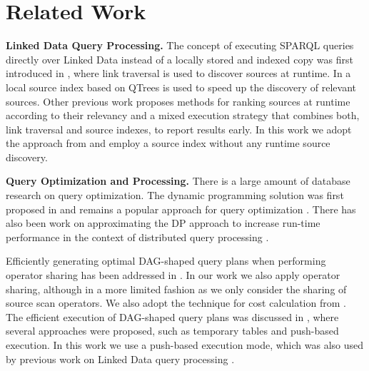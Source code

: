 \section{Related Work}
\label{sec:related}

\textbf{Linked Data Query Processing.} The concept of executing SPARQL
queries directly over Linked Data instead of a locally stored and
indexed copy was first introduced in \cite{hartig_executing_2009},
where link traversal is used to discover sources at runtime. In
\cite{harth_data_2010} a local source index based on QTrees is used to
speed up the discovery of relevant sources. Other previous work
\cite{ladwig_linked_2010,sihjoin_2011} proposes methods for ranking
sources at runtime according to their relevancy and a mixed execution
strategy that combines both, link traversal and source indexes, to
report results early. In this work we adopt the approach from
\cite{harth_data_2010} and employ a source index without any runtime
source discovery. %






\textbf{Query Optimization and Processing.} There is a large amount of
database research on query optimization. The dynamic programming
solution was first proposed in \cite{selinger_access_1979} and remains a
popular approach for query optimization
\cite{moerkotte_analysis_2006,moerkotte_dynamic_2008}. There has also
been work on approximating the DP approach to increase run-time
performance in the context of distributed query processing
\cite{kossmann_iterative_2000}.

Efficiently generating optimal DAG-shaped query plans when performing
operator sharing has been addressed in
\cite{neumann_generating_2009}. In our work we also apply operator
sharing, although in a more limited fashion as we only consider the
sharing of source scan operators. We also adopt the technique for cost
calculation from \cite{neumann_generating_2009}. The efficient
execution of DAG-shaped query plans was discussed in
\cite{Neumann_2005}, where several approaches were proposed, such as
temporary tables and push-based execution. In this work we use a
push-based execution mode, which was also used by previous work on
Linked Data query processing \cite{ladwig_linked_2010,sihjoin_2011}.

